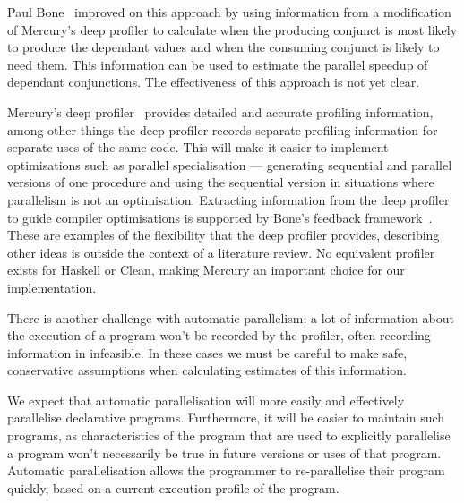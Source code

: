 Paul Bone~\cite{bone:2008:hons} improved on this approach by using
information from a modification of Mercury's deep profiler to
calculate when the producing conjunct is most likely to produce the
dependant values and when the consuming conjunct is likely to need
them.
This information can be used to estimate the parallel speedup of
dependant conjunctions.
The effectiveness of this approach is not yet clear.

Mercury's deep profiler~\cite{conway:2001:mercury-deep} provides
detailed and accurate profiling information,
among other things the deep profiler records separate profiling
information for separate uses of the same code.
This will make it easier to implement optimisations such as
parallel specialisation --- generating sequential and parallel
versions of one procedure and using the sequential version
in situations where parallelism is not an optimisation.
Extracting information from the deep profiler to guide compiler
optimisations is supported by Bone's feedback
framework~\cite{bone:2008:hons}.
These are examples of the flexibility that the deep profiler provides,
describing other ideas is outside the context of a literature review.
No equivalent profiler exists for Haskell or Clean, making Mercury an
important choice for our implementation.

There is another challenge with automatic parallelism: a lot of
information about the execution of a program won't be recorded by the
profiler, often recording information in infeasible.
In these cases we must be careful to make safe, conservative
assumptions when calculating estimates of this information.



We expect that automatic parallelisation will more easily and
effectively parallelise declarative programs.
Furthermore, it will be easier to maintain such programs, as
characteristics of the program that are used to explicitly parallelise
a program won't necessarily be true in future versions or uses of that
program.
Automatic parallelisation allows the programmer to re-parallelise
their program quickly, based on a current execution profile of the
program.

